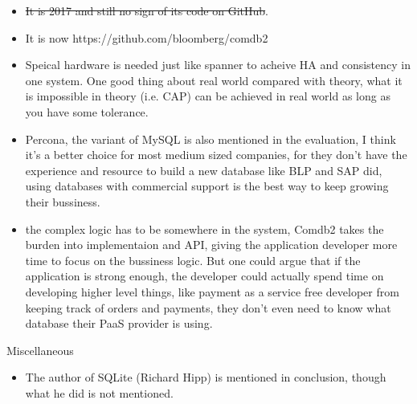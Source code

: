 \documentclass[12pt,a4paper,oneside]{article}
\begin{document}
\begin{itemize}
  \item \sout{It is 2017 and still no sign of its code on GitHub}.
  \item It is now https://github.com/bloomberg/comdb2
  \item Speical hardware is needed just like spanner to acheive HA and consistency in one system.
  One good thing about real world compared with theory, what it is impossible in theory (i.e. CAP) can be achieved in real world as long as you have some tolerance.
  \item Percona, the variant of MySQL is also mentioned in the evaluation, I think it's a better choice for most medium sized companies,
  for they don't have the experience and resource to build a new database like BLP and SAP did, using databases with commercial support
  is the best way to keep growing their bussiness.
  \item the complex logic has to be somewhere in the system, Comdb2 takes the burden into implementaion and API, giving the application
  developer more time to focus on the bussiness logic. But one could argue that if the application is strong enough, the developer could
  actually spend time on developing higher level things, like payment as a service free developer from keeping track of orders and payments,
  they don't even need to know what database their PaaS provider is using.
\end{itemize}

Miscellaneous

\begin{itemize}
  \item The author of SQLite (Richard Hipp) is mentioned in conclusion, though what he did is not mentioned.
\end{itemize}
\end{document}
